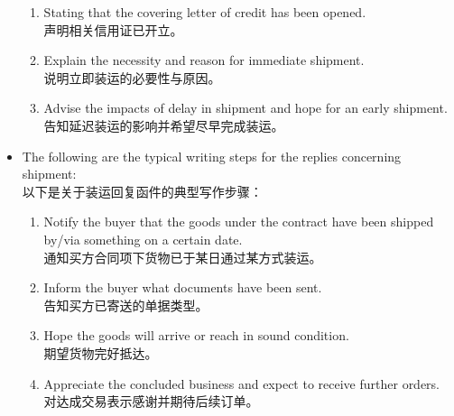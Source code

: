 \documentclass[12pt]{beamer}
\begin{document}
\begin{frame}[allowframebreaks]
\begin{itemize}
    \begin{enumerate}
    \item Stating that the covering letter of credit has been opened. \\
    声明相关信用证已开立。
    
    \item Explain the necessity and reason for immediate shipment. \\
    说明立即装运的必要性与原因。
    
    \item Advise the impacts of delay in shipment and hope for an early shipment. \\
    告知延迟装运的影响并希望尽早完成装运。
    \end{enumerate}
    
    \item The following are the typical writing steps for the replies concerning shipment: \\
    以下是关于装运回复函件的典型写作步骤：
    
    \begin{enumerate}
    \item Notify the buyer that the goods under the contract have been shipped by/via something on a certain date. \\
    通知买方合同项下货物已于某日通过某方式装运。
    
    \item Inform the buyer what documents have been sent. \\
    告知买方已寄送的单据类型。
    
    \item Hope the goods will arrive or reach in sound condition. \\
    期望货物完好抵达。
    
    \item Appreciate the concluded business and expect to receive further orders. \\
    对达成交易表示感谢并期待后续订单。
    \end{enumerate}
    \end{itemize}
    \end{frame}
\end{document}
